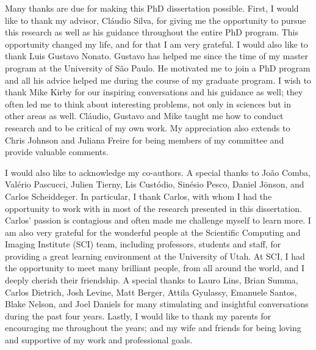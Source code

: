 
Many thanks are due for making this PhD dissertation possible. 
%
First, I would like to thank my advisor, Cl\'audio Silva, for giving me the opportunity to pursue this research as well as his guidance throughout the entire PhD program. This opportunity changed my life, and for that I am very grateful.
%
I would also like to thank Luis Gustavo Nonato. Gustavo has helped me since the time of my master program at the University of S\~ao Paulo. He motivated me to join a PhD program and all his advice helped me during the course of my graduate program.  
%
I wish to thank Mike Kirby for our inspiring conversations and his guidance as well; they often led me to think about interesting problems, not only in sciences but in other areas as well. 
%
Cl\'audio, Gustavo and Mike taught me how to conduct research and to be critical of my own work.  
%
My appreciation also extends to Chris Johnson and Juliana Freire for being members of my committee and provide valuable comments. 

I would also like to acknowledge my co-authors. A special thanks to Jo\~ao Comba, Val\'erio Pascucci, Julien Tierny,  Lis Cust\'odio, Sin\'esio Pesco, Daniel J\"onson, and  Carlos Scheiddeger. In particular, I thank Carlos, with whom I had the opportunity to work with in most of the research presented in this dissertation. Carlos' passion is contagious and often made me challenge myself to learn more.
%
I am also very grateful for the wonderful people at the Scientific Computing and Imaging Institute (SCI) team, including professors, students and staff,  for providing a great learning environment at the University of Utah. 
%
At SCI, I had the opportunity to meet many brilliant people, from all around the world, and I deeply cherish their friendship.
%
A special thanks to Lauro Lins, Brian Summa, Carlos Dietrich, Josh Levine, Matt Berger, Attila Gyulassy, Emanuele Santos, Blake Nelson, and Joel Daniels for many stimulating and insightful conversations during the past four years.
%
Lastly, I would like to thank my parents for encouraging me throughout the years; and my wife and friends for being loving and supportive of my work and professional goals.